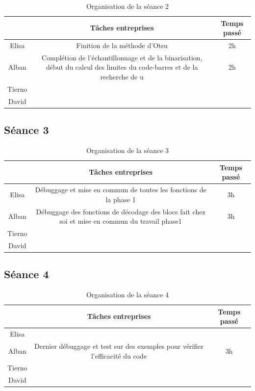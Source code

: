 \documentclass{rapport}
\begin{document}
\begin{table}[H]
	\centering 
	\begin{tabular}{c|c|c}
		& Tâches entreprises& Temps passé\\ \hline
		Elisa& Finition de la méthode d'Otsu & 2h\\ \hline
		Alban& Complétion de l'échantillonnage et de la binarisation, début du calcul des limites du code-barres et de la recherche de u& 2h\\ \hline
		Tierno& & \\ \hline
		David& & 
	\end{tabular}
	\caption{Organisation de la séance 2}
\end{table}

\subsection{Séance 3}

\begin{table}[H]
	\centering 
	\begin{tabular}{c|c|c}
		& Tâches entreprises& Temps passé\\ \hline
		Elisa& Débuggage et mise en commun de toutes les fonctions de la phase 1 & 3h\\ \hline
		Alban& Débuggage des fonctions de décodage des blocs fait chez soi et mise en commun du travail phase1& 3h\\ \hline
		Tierno& & \\ \hline
		David& & 
	\end{tabular}
	\caption{Organisation de la séance 3}
\end{table}

\subsection{Séance 4}

\begin{table}[H]
	\centering 
	\begin{tabular}{c|c|c}
		& Tâches entreprises& Temps passé\\ \hline
		Elisa& & \\ \hline
		Alban& Dernier débuggage et test sur des exemples pour vérifier l'efficacité du code& 3h\\ \hline
		Tierno& & \\ \hline
		David& & 
	\end{tabular}
	\caption{Organisation de la séance 4}
\end{table}
\end{document}
